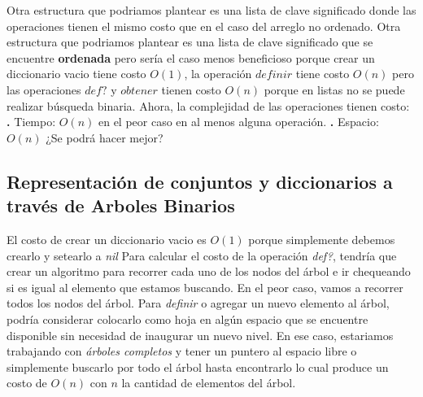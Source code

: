 \documentclass[10pt,a4paper]{article}
\begin{document}
\newline
\newline
Otra estructura que podriamos plantear es una lista de clave significado  donde las operaciones tienen el mismo costo que en el caso del arreglo no ordenado.
\newline
\newline
Otra estructura que podriamos plantear es una lista de clave significado  que se encuentre \textbf{ordenada} pero sería el caso menos beneficioso porque crear un diccionario vacio tiene costo $O(1)$, la operación $definir$ tiene costo $O(n)$ pero las operaciones $def?$ y $obtener$ tienen costo $O(n)$ porque en listas no se puede realizar búsqueda binaria.
\newline
\newline
Ahora, la complejidad de las operaciones tienen costo:
\newline
\newline
\textbf{.} Tiempo: $O(n)$ en el peor caso en al menos alguna operación.
\newline
\newline
\textbf{.} Espacio: $O(n)$
\newline
\newline
¿Se podrá hacer mejor?

\subsection{Representación de conjuntos y diccionarios a través de Arboles Binarios}

El costo de crear un diccionario vacio es $O(1)$ porque simplemente debemos crearlo y setearlo a \textit{nil}
\newline
\newline
Para calcular el costo de la operación \textit{def?}, tendría que crear un algoritmo para recorrer cada uno de los nodos del árbol e ir chequeando si es igual al elemento que estamos buscando. En el peor caso, vamos a recorrer todos los nodos del árbol.
\newline
\newline
Para \textit{definir} o agregar un nuevo elemento al árbol, podría considerar colocarlo como hoja en algún espacio que se encuentre disponible sin necesidad de inaugurar un nuevo nivel. En ese caso, estariamos trabajando con \textit{árboles completos} y tener un puntero al espacio libre o simplemente buscarlo por todo el árbol hasta encontrarlo lo cual produce un costo de $O(n)$ con $n$ la cantidad de elementos del árbol.
\end{document}
